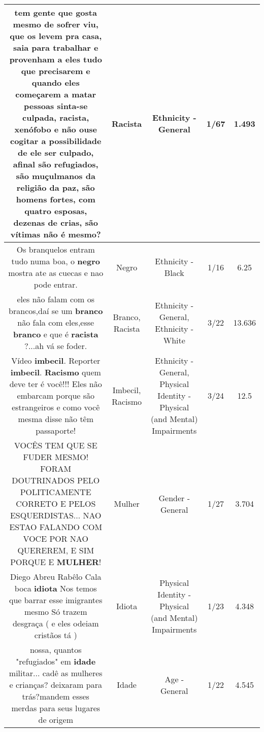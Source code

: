 \documentclass[11pt]{article}
\newlength\mylength
\begin{document}
\begin{center}
\begin{longtable}{|C{.65\mylength}|C{.30\mylength}|C{.12\mylength}|C{.12\mylength}|C{.12\mylength}|}
  \small tem gente que gosta mesmo de sofrer viu, que os levem pra casa, saia para trabalhar e provenham a eles tudo que precisarem e quando eles começarem a matar pessoas sinta-se culpada, \textbf{racista}, xenófobo e não ouse cogitar a possibilidade de ele ser culpado, afinal são refugiados, são muçulmanos da religião da paz, são homens fortes, com quatro esposas, dezenas de crias, são vítimas não é mesmo?\normalsize   & Racista & Ethnicity - General & 1/67 & 1.493 \\  \hline
  \small Os branquelos entram tudo numa boa, o \textbf{negro} mostra ate as cuecas e nao pode entrar.\normalsize   & Negro & Ethnicity - Black & 1/16 & 6.25 \\  \hline
  \small eles não falam com os brancos,daí se um \textbf{branco} não fala com eles,esse \textbf{branco} e que é \textbf{racista} ?...ah vá se foder.\normalsize   & Branco, Racista & Ethnicity - General, Ethnicity - White & 3/22 & 13.636 \\  \hline
  \small Vídeo \textbf{imbecil}. Reporter \textbf{imbecil}. \textbf{Racismo} quem deve ter é você!!! Eles não embarcam porque são estrangeiros e como você mesma disse não têm passaporte!\normalsize   & Imbecil, Racismo & Ethnicity - General, Physical Identity - Physical (and Mental) Impairments & 3/24 & 12.5 \\  \hline
  \small VOCÊS TEM QUE SE FUDER MESMO! FORAM DOUTRINADOS PELO POLITICAMENTE CORRETO E PELOS ESQUERDISTAS... NAO ESTAO FALANDO COM VOCE POR NAO QUEREREM, E SIM PORQUE E \textbf{MULHER}!\normalsize   & Mulher & Gender - General & 1/27 & 3.704 \\  \hline
  \small Diego Abreu Rabêlo Cala boca   \textbf{idiota} Nos  temos  que   barrar  esse imigrantes mesmo Só  trazem  desgraça  ( e  eles  odeiam   cristãos  tá )\normalsize   & Idiota & Physical Identity - Physical (and Mental) Impairments & 1/23 & 4.348 \\  \hline
  \small nossa, quantos "refugiados" em \textbf{idade} militar... cadê as mulheres e crianças? deixaram para trás?mandem esses merdas para seus lugares de origem\normalsize   & Idade & Age - General & 1/22 & 4.545 \\  \hline

\end{longtable}
\end{center}
\end{document}
